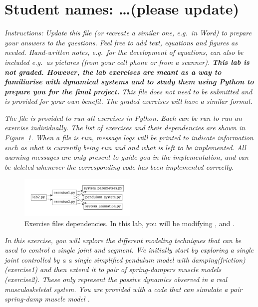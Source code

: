 \documentclass{cmc}
\begin{document}
\pagestyle{fancy}
 

\section*{Student names: \ldots (please update)}

\textit{Instructions: Update this file (or recreate a similar one, e.g.\ in
  Word) to prepare your answers to the questions. Feel free to add text,
  equations and figures as needed. Hand-written notes, e.g.\ for the development
  of equations, can also be included e.g.\ as pictures (from your cell phone or
  from a scanner).  \textbf{This lab is not graded. However, the lab exercises
    are meant as a way to familiarise with dynamical systems and to study them
    using Python to prepare you for the final project.} This file does not need
  to be submitted and is provided for your own benefit. The graded exercises
  will have a similar format.}

\textit{The file  is provided to run all exercises in
  Python. Each  can be run to run an exercise
  individually. The list of exercises and their dependencies are shown in
  Figure~\ref{fig:files}. When a file is run, message logs will be printed to
  indicate information such as what is currently being run and and what is left
  to be implemented. All warning messages are only present to guide you in the
  implementation, and can be deleted whenever the corresponding code has been
  implemented correctly.}

\begin{figure}[ht]
  \centering \includegraphics[width=0.5\textwidth]{figures/files}
  \caption{\label{fig:files} Exercise files dependencies. In this lab, you will
    be modifying ,  and .
    }
\end{figure}

\textit{In this exercise, you will explore the different modeling
  techniques that can be used to control a single joint and
  segment. We initially start by exploring a single joint controlled
  by a a single simplified pendulum model with damping(friction) (exercise1)
  and then extend it to pair of spring-dampers muscle models (exercise2).
  These only represent the passive dynamics observed in a real musculoskeletal system.
  You are provided with a code that can simulate a pair spring-damp muscle model
  . }
\end{document}
